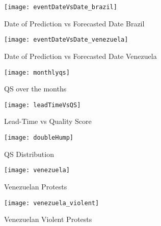 \begin{figure}
    \texttt{[image: eventDateVsDate\_brazil]}
    \caption{Date of Prediction vs Forecasted Date Brazil}
    \label{fig:leadtime_brazil}
\end{figure}

\begin{figure}
    \texttt{[image: eventDateVsDate\_venezuela]}
    \caption{Date of Prediction vs Forecasted Date Venezuela}
    \label{fig:leadtime_venezuela}
\end{figure}

\begin{figure}
    \texttt{[image: monthlyqs]}
    \caption{QS over the months}
    \label{fig:monthlyqs}
\end{figure}

\begin{figure}
    \texttt{[image: leadTimeVsQS]}
    \caption{Lead-Time vs Quality Score}
    \label{fig:leadTimeVsQS}
\end{figure}

\begin{figure}
    \texttt{[image: doubleHump]}
    \caption{QS Distribution}
    \label{fig:doubleHump}
\end{figure}

\begin{figure}
    \texttt{[image: venezuela]}
    \label{fig:venezuela}
    \caption{Venezuelan Protests}
\end{figure}

\begin{figure}
    \texttt{[image: venezuela\_violent]}
    \label{fig:venezuela_violent}
    \caption{Venezuelan Violent Protests}
\end{figure}










